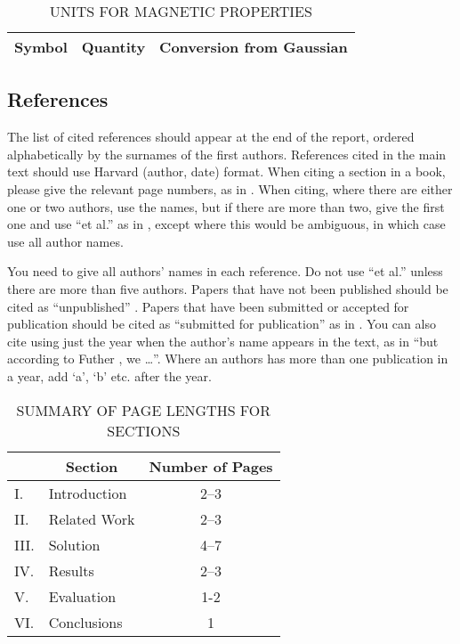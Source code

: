 \documentclass[conference]{IEEEtran}
\begin{document}
\begin{table}[htb]
\centering
\caption{UNITS FOR MAGNETIC PROPERTIES}
\vspace*{6pt}
\label{units}
\begin{tabular}{ccc}\hline\hline
Symbol & Quantity & Conversion from Gaussian \\ \hline
\end{tabular}
\end{table}

\subsection{References}

The list of cited references should appear at the end of the report, ordered alphabetically by the surnames of the first authors.  References cited in the main text should use Harvard (author, date) format.  When citing a section in a book, please give the relevant page numbers, as in \cite[p293]{budgen}.  When citing, where there are either one or two authors, use the names, but if there are more than two, give the first one and use ``et al.'' as in  , except where this would be ambiguous, in which case use all author names.

You need to give all authors' names in each reference.  Do not use ``et al.'' unless there are more than five authors.  Papers that have not been published should be cited as ``unpublished'' \cite{euther}.  Papers that have been submitted or accepted for publication should be cited as ``submitted for publication'' as in \cite{futher} .  You can also cite using just the year when the author's name appears in the text, as in ``but according to Futher \citeyear{futher}, we \dots''.  Where an authors has more than one publication in a year, add `a', `b' etc. after the year.

\iffalse
#################################################################################
\fi

\begin{table}[htb]
\centering
\caption{SUMMARY OF PAGE LENGTHS FOR SECTIONS}
\vspace*{6pt}
\label{summary}
\begin{tabular}{|ll|c|} \hline
& \multicolumn{1}{c|}{\bf Section} & {\bf Number of Pages} \\ \hline
I. & Introduction & 2--3 \\ \hline
II. & Related Work & 2--3 \\ \hline
III. & Solution & 4--7 \\ \hline
IV. & Results & 2--3 \\ \hline
V. & Evaluation & 1-2 \\ \hline
VI. & Conclusions & 1 \\ \hline
\end{tabular}
\end{table}
\end{document}
